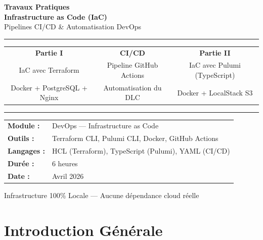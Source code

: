 \documentclass[12pt,a4paper]{article}
\begin{document}
\begin{titlepage}
  \centering
  \vspace*{1.5cm}

  {\Huge\bfseries Travaux Pratiques\\[0.5em]
  Infrastructure as Code (IaC)}\\[0.5em]
  {\Large\color{gray} Pipelines CI/CD \& Automatisation DevOps}

  \vspace{0.8cm}
  \rule{\linewidth}{1.5pt}
  \vspace{0.5cm}

  \begin{tabular}{ccc}
    \Large\textcolor{terraformPurple}{\textbf{Partie I}} &
    \Large\textcolor{cicdGreen}{\textbf{CI/CD}} &
    \Large\textcolor{pulumiBlue}{\textbf{Partie II}} \\[0.3em]
    \textcolor{terraformPurple}{IaC avec Terraform} &
    \textcolor{cicdGreen}{Pipeline GitHub Actions} &
    \textcolor{pulumiBlue}{IaC avec Pulumi (TypeScript)} \\[0.2em]
    Docker + PostgreSQL + Nginx &
    Automatisation du DLC &
    Docker + LocalStack S3 \\
  \end{tabular}

  \vspace{0.5cm}
  \rule{\linewidth}{0.5pt}
  \vspace{1.5cm}

  \begin{tabular}{ll}
    \textbf{Module :}   & DevOps --- Infrastructure as Code \\[0.4em]
    \textbf{Outils :}   & Terraform CLI, Pulumi CLI, Docker, GitHub Actions \\[0.4em]
    \textbf{Langages :} & HCL (Terraform), TypeScript (Pulumi), YAML (CI/CD) \\[0.4em]
    \textbf{Durée :}    & 6 heures \\[0.4em]
    \textbf{Date :}     & Avril 2026 \\
  \end{tabular}

  \vfill
  {\small\color{gray} Infrastructure 100\% Locale --- Aucune dépendance cloud réelle}
\end{titlepage}

\tableofcontents
\newpage

\section{Introduction Générale}
\end{document}
